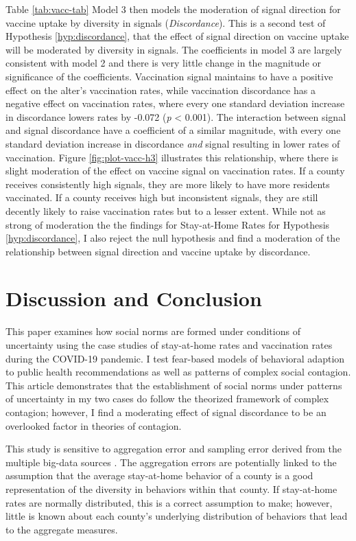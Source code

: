 Table \ref{tab:vacc-tab} Model 3 then models the moderation of signal direction
for vaccine uptake by diversity in signals (\emph{Discordance}). This is a
second test of Hypothesis \ref{hyp:discordance}, that the effect of signal
direction on vaccine uptake will be moderated by diversity in signals. The
coefficients in model 3 are largely consistent with model 2 and there is very
little change in the magnitude or significance of the coefficients. Vaccination
signal maintains to have a positive effect on the alter's vaccination rates,
while vaccination discordance has a negative effect on vaccination rates, where
every one standard deviation increase in discordance lowers rates by -0.072
(\emph{p} \textless{} 0.001). The interaction between signal and signal
discordance have a coefficient of a similar magnitude, with every one standard
deviation increase in discordance \emph{and} signal resulting in lower rates of
vaccination. Figure \ref{fig:plot-vacc-h3} illustrates this relationship, where
there is slight moderation of the effect on vaccine signal on vaccination rates.
If a county receives consistently high signals, they are more likely to have
more residents vaccinated. If a county receives high but inconsistent signals,
they are still decently likely to raise vaccination rates but to a lesser
extent. While not as strong of moderation the the findings for Stay-at-Home
Rates for Hypothesis \ref{hyp:discordance}, I also reject the null hypothesis
and find a moderation of the relationship between signal direction and vaccine
uptake by discordance.

\hypertarget{discussion-and-conclusion}{%
\section{Discussion and Conclusion}\label{discussion-and-conclusion}}

This paper examines how social norms are formed under conditions of uncertainty
using the case studies of stay-at-home rates and vaccination rates during the
COVID-19 pandemic. I test fear-based models of behavioral adaption to public
health recommendations as well as patterns of complex social contagion. This
article demonstrates that the establishment of social norms under patterns of
uncertainty in my two cases do follow the theorized framework of complex
contagion; however, I find a moderating effect of signal discordance to be an
overlooked factor in theories of contagion.

This study is sensitive to aggregation error and sampling error derived from the
multiple big-data sources \citep{facebook20, google2020}. The aggregation errors
are potentially linked to the assumption that the average stay-at-home behavior
of a county is a good representation of the diversity in behaviors within that
county. If stay-at-home rates are normally distributed, this is a correct
assumption to make; however, little is known about each county's underlying
distribution of behaviors that lead to the aggregate measures.

